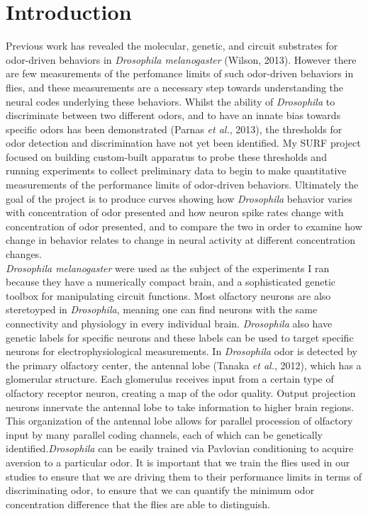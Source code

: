 \documentclass{article}
\begin{document}
\section{Introduction}

Previous work has revealed the molecular, genetic, and circuit substrates for odor-driven behaviors in \textit{Drosophila melanogaster} (Wilson, 2013). However there are few measurements of the perfomance limits of such odor-driven behaviors in flies, and these measurements are a necessary step towards understanding the neural codes underlying these behaviors. Whilst the ability of \textit{Drosophila} to discriminate between two different odors, and to have an innate bias towards specific odors has been demonstrated (Parnas \textit{et al.}, 2013), the thresholds for odor detection and discrimination have not yet been identified. My SURF project focused on building custom-built apparatus to probe these thresholds and running experiments to collect preliminary data to begin to make quantitative measurements of the performance limits of odor-driven behaviors. Ultimately the goal of the project is to produce curves showing how \textit{Drosophila} behavior varies with concentration of odor presented and how neuron spike rates change with concentration of odor presented, and to compare the two in order to examine how change in behavior relates to change in neural activity at different concentration changes.\\

\textit{Drosophila melanogaster} were used as the subject of the experiments I ran because they have a numerically compact brain, and a sophisticated genetic toolbox for manipulating circuit functions. Most olfactory neurons are also steretoyped in \textit{Drosophila}, meaning one can find neurons with the same connectivity and physiology in every individual brain. \textit{Drosophila} also have genetic labels for specific neurons and these labels can be used to target specific neurons for electrophysiological measurements. In \textit{Drosophila} odor is detected by the primary olfactory center, the antennal lobe (Tanaka \textit{et al.}, 2012), which has a glomerular structure. Each glomerulus receives input from a certain type of olfactory receptor neuron, creating a map of the odor quality. Output projection neurons innervate the antennal lobe to take information to higher brain regions. This organization of the antennal lobe allows for parallel procession of olfactory input by many parallel coding channels, each of which can be genetically identified.\textit{Drosophila} can be easily trained via Pavlovian conditioning to acquire aversion to a particular odor. It is important that we train the flies used in our studies to ensure that we are driving them to their performance limits in terms of discriminating odor, to ensure that we can quantify the minimum odor concentration difference that the flies are able to distinguish.\\
\end{document}
